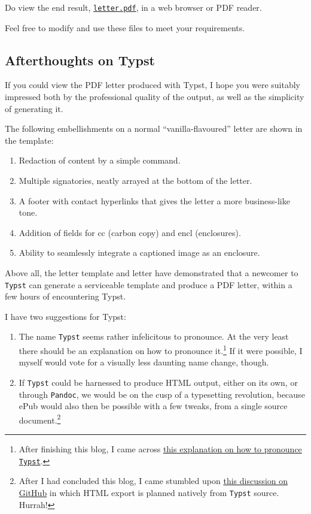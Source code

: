 \documentclass[
  a4paper,
]{article}
\begin{document}
Do view the end result,
\href{auxiliary/letter.pdf}{\texttt{letter.pdf}}, in a web browser or
PDF reader.

Feel free to modify and use these files to meet your requirements.

\hypertarget{afterthoughts-on-typst}{%
\subsection{Afterthoughts on Typst}\label{afterthoughts-on-typst}}

If you could view the PDF letter produced with Typst, I hope you were
suitably impressed both by the professional quality of the output, as
well as the simplicity of generating it.

The following embellishments on a normal ``vanilla-flavoured'' letter
are shown in the template:

\begin{enumerate}
\def\labelenumi{\alph{enumi}.}
\item
  Redaction of content by a simple command.
\item
  Multiple signatories, neatly arrayed at the bottom of the letter.
\item
  A footer with contact hyperlinks that gives the letter a more
  business-like tone.
\item
  Addition of fields for cc (carbon copy) and encl (enclosures).
\item
  Ability to seamlessly integrate a captioned image as an enclosure.
\end{enumerate}

Above all, the letter template and letter have demonstrated that a
newcomer to \texttt{Typst} can generate a serviceable template and
produce a PDF letter, within a few hours of encountering Typst.

I have two suggestions for Typst:

\begin{enumerate}
\def\labelenumi{\roman{enumi}.}
\item
  The name \texttt{Typst} seems rather infelicitous to pronounce. At the
  very least there should be an explanation on how to pronounce
  it.\footnote{After finishing this blog, I came across
    \href{https://github.com/typst/typst\#pronunciation-and-spelling}{this
    explanation on how to pronounce \texttt{Typst}}.} If it were
  possible, I myself would vote for a visually less daunting name
  change, though.  \normalfont
\item
  If \texttt{Typst} could be harnessed to produce HTML output, either on
  its own, or through \texttt{Pandoc}, we would be on the cusp of a
  typesetting revolution, because ePub would also then be possible with
  a few tweaks, from a single source document.\footnote{After I had
    concluded this blog, I came stumbled upon
    \href{https://github.com/typst/typst/issues/721}{this discussion on
    GitHub} in which HTML export is planned natively from \texttt{Typst}
    source. Hurrah!}
\end{enumerate}
\end{document}
